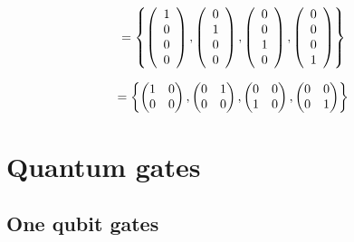 \documentclass[a4paper,12pt]{report}
\begin{document}
\begin{equation}
	 =  \left\{ \left( \begin{array}{c} 1 \\ 0 \\ 0 \\ 0 \end{array} \right ), \left( \begin{array}{c} 0 \\ 1 \\ 0 \\ 0 \end{array} \right ), \left( \begin{array}{c} 0 \\ 0 \\ 1 \\ 0 \end{array} \right ), \left( \begin{array}{c} 0 \\ 0 \\ 0 \\ 1 \end{array} \right ) \right\} \\
\end{equation}

\vspace{1\baselineskip}

\begin{equation}
	 =  \left\{ \left( \begin{matrix} 1 & 0 \\ 0 & 0 \end{matrix} \right ), \left( \begin{matrix} 0 & 1 \\ 0 & 0 \end{matrix} \right ), \left( \begin{matrix} 0 & 0 \\ 1 & 0 \end{matrix} \right ), \left( \begin{matrix} 0 & 0 \\ 0 & 1 \end{matrix} \right ) \right\} \\
\end{equation}


    \section{Quantum gates}
        \subsection{One qubit gates}
\end{document}
